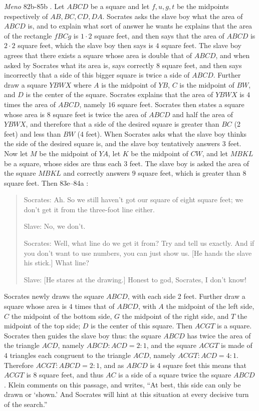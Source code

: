\documentclass{amsart}
\theoremstyle{definition}
\begin{document}
{\em Meno} 82b-85b \cite[pp.~102--111]{beresford}. Let $ABCD$ be a square and let $f,u,g,t$ be the midpoints respectively of
$AB,BC,CD,DA$. Socrates asks the slave boy what the area of $ABCD$ is, and to explain what sort of answer he wants he explains that the area of the rectangle
$fBCg$ is $1 \cdot 2$ square feet, and then says that the area of $ABCD$ is $2 \cdot 2$ square feet, which the slave boy then says is $4$ square feet.
The slave boy agrees that there exists a square whose area is double that of $ABCD$, and when asked by Socrates what its area is, says correctly $8$ square feet, and then
says incorrectly that a side of this bigger square is twice a side of $ABCD$. 
Further draw a square $YBWX$ where $A$ is the midpoint of $YB$, $C$ is the midpoint of $BW$, and $D$ is the center of the square.
Socrates explains that the area of $YBWX$ is $4$ times the area of $ABCD$, namely $16$ square feet.
Socrates then states a square whose area is $8$ square feet is twice the area of $ABCD$ and half the area of $YBWX$, and therefore that a side of the desired square is
greater than $BC$ (2 feet) and less than $BW$ (4 feet). When Socrates asks what the slave boy thinks the side of the desired square is, and the slave boy tentatively answers
$3$ feet. Now let $M$ be the midpoint of $YA$, let $K$ be the midpoint of $CW$, and let $MBKL$ be a square, whose sides are thus each $3$ feet.
The slave boy is asked the area of the square $MBKL$ and correctly answers $9$ square feet, which is greater than $8$ square feet. Then 83e--84a \cite[p.~108]{beresford}:

\begin{quote}
Socrates: Ah. So we still haven't got our square of eight square feet; we don't get it from the three-foot line either.

Slave: No, we don't.

Socrates: Well, what line do we get it from? Try and tell us exactly. And if you don't want to use numbers, you can just show us. [He hands the slave his stick.] What line?

Slave: [He stares at the drawing.] Honest to god, Socrates, I don't know!
\end{quote}

Socrates newly draws the square $ABCD$, with each side  2 feet. Further draw a square whose area is $4$ times that of $ABCD$, with $A$ the midpoint of the left side, $C$ the midpoint
of the bottom side, $G$ the midpoint of the right side, and $T$ the midpoint of the top side; $D$ is the center of this square. Then $ACGT$ is a square. Socrates then guides
the slave boy thus: the square $ABCD$ has twice the area of the triangle $ACD$, namely
$ABCD:ACD = 2:1$,
and the square $ACGT$ is made of $4$ triangles each congruent to the triangle $ACD$, namely $ACGT:ACD = 4:1$. Therefore $ACGT:ABCD = 2:1$, and as $ABCD$ is
$4$ square feet this means that $ACGT$ is $8$ square feet, and thus $AC$ is a side of a square twice the square $ABCD$.  
Klein \cite[pp.~99--102]{meno} comments on this passage, and writes, ``At best, this side can only be drawn or `shown.' And Socrates
will hint at this situation at every decisive turn of the search.'' 
\end{document}
